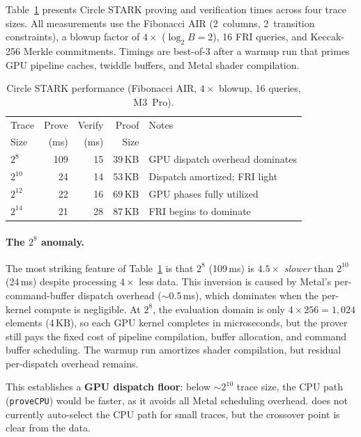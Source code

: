 Table~\ref{tab:circle-stark} presents Circle STARK proving and verification
times across four trace sizes.  All measurements use the Fibonacci AIR
(2~columns, 2~transition constraints), a blowup factor of $4\times$
($\log_2 B = 2$), 16 FRI queries, and Keccak-256 Merkle commitments.
Timings are best-of-3 after a warmup run that primes GPU pipeline caches,
twiddle buffers, and Metal shader compilation.

\begin{table}[t]
\centering
\small
\caption{Circle STARK performance (Fibonacci AIR, $4\times$ blowup, 16 queries, M3~Pro).}
\label{tab:circle-stark}
\begin{tabular}{lrrrl}
\toprule
Trace & Prove & Verify & Proof & Notes \\
Size  & (ms)  & (ms)   & Size  & \\
\midrule
$2^{8}$  & 109  & 15  & 39\,KB & GPU dispatch overhead dominates \\
$2^{10}$ &  24  & 14  & 53\,KB & Dispatch amortized; FRI light \\
$2^{12}$ &  22  & 16  & 69\,KB & GPU phases fully utilized \\
$2^{14}$ &  21  & 28  & 87\,KB & FRI begins to dominate \\
\bottomrule
\end{tabular}
\end{table}

\paragraph{The $2^8$ anomaly.}
The most striking feature of Table~\ref{tab:circle-stark} is that $2^8$
(109\,ms) is $4.5\times$ \emph{slower} than $2^{10}$ (24\,ms) despite
processing $4\times$ less data.  This inversion is caused by Metal's
per-command-buffer dispatch overhead (${\sim}$0.5\,ms), which dominates
when the per-kernel compute is negligible.  At $2^8$, the evaluation domain
is only $4 \times 256 = 1{,}024$ elements (4\,KB), so each GPU kernel
completes in microseconds, but the prover still pays the fixed cost of
pipeline compilation, buffer allocation, and command buffer scheduling.
The warmup run amortizes shader compilation, but residual per-dispatch
overhead remains.

This establishes a \textbf{GPU dispatch floor}: below ${\sim}2^{10}$
trace size, the CPU path (\texttt{proveCPU}) would be faster, as it avoids
all Metal scheduling overhead.  \sys does not currently auto-select the CPU
path for small traces, but the crossover point is clear from the data.


